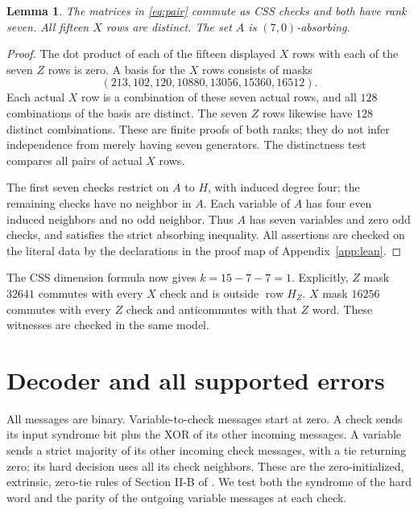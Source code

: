 \documentclass[11pt]{article}
\newtheorem{lemma}[theorem]{Lemma}
\newcommand{\row}{\operatorname{row}}
\begin{document}
\begin{lemma}\label{lem:css}
The matrices in \eqref{eq:pair} commute as CSS checks and both have rank
seven. All fifteen $X$ rows are distinct. The set $A$ is $(7,0)$-absorbing.
\end{lemma}
\begin{proof}
The dot product of each of the fifteen displayed $X$ rows with each of
the seven $Z$ rows is zero. A basis for the $X$ rows consists of masks
\[
 (213,102,120,10880,13056,15360,16512).
\]
Each actual $X$ row is a combination of these seven actual rows, and all
$128$ combinations of the basis are distinct. The seven $Z$ rows likewise
have $128$ distinct combinations. These are finite proofs of both ranks;
they do not infer independence from merely having seven generators.
The distinctness test compares all pairs of actual $X$ rows.

The first seven checks restrict on $A$ to $H$, with induced degree four;
the remaining checks have no neighbor in $A$. Each variable of $A$ has
four even induced neighbors and no odd neighbor. Thus $A$ has seven
variables and zero odd checks, and satisfies the strict absorbing inequality.
All assertions are checked on the literal data by the declarations in the
proof map of Appendix~\ref{app:lean}.
\end{proof}
The CSS dimension formula now gives $k=15-7-7=1$. Explicitly,
$Z$ mask $32641$ commutes with every $X$ check and is outside $\row H_Z$.
$X$ mask $16256$ commutes with every $Z$ check and anticommutes with that
$Z$ word. These witnesses are checked in the same model.

\section{Decoder and all supported errors}\label{sec:decode}
All messages are binary. Variable-to-check messages start at zero. A check
sends its input syndrome bit plus the XOR of its other incoming messages.
A variable sends a strict majority of its other incoming check messages,
with a tie returning zero; its hard decision uses all its check neighbors.
These are the zero-initialized, extrinsic, zero-tie rules of Section II-B
of \cite{mpk}. We test both the syndrome of the hard word and the parity
of the outgoing variable messages at each check.
\end{document}
